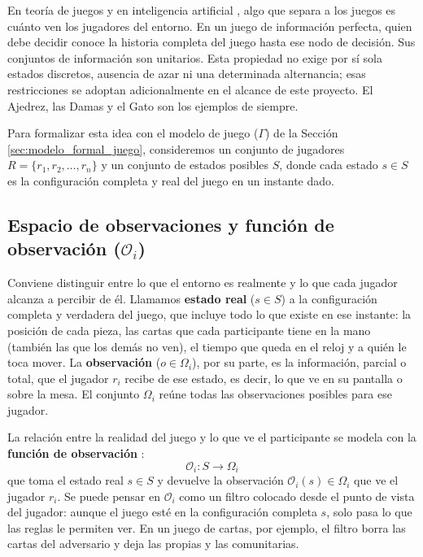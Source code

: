En teoría de juegos y en inteligencia artificial \cite{Kuhn1953, OsborneRubinstein1994, RussellNorvig2010}, algo que separa a los juegos es cuánto ven los jugadores del entorno. En un juego de información perfecta, quien debe decidir conoce la historia completa del juego hasta ese nodo de decisión. Sus conjuntos de información son unitarios. Esta propiedad no exige por sí sola estados discretos, ausencia de azar ni una determinada alternancia; esas restricciones se adoptan adicionalmente en el alcance de este proyecto. El Ajedrez, las Damas y el Gato son los ejemplos de siempre.

Para formalizar esta idea con el modelo de juego ($\Gamma$) de la Sección \ref{sec:modelo_formal_juego}, consideremos un conjunto de jugadores $R = \{r_1, r_2, \dots, r_n\}$ y un conjunto de estados posibles $S$, donde cada estado $s \in S$ es la configuración completa y real del juego en un instante dado.

\subsection{Espacio de observaciones y función de observación (\texorpdfstring{$\mathcal{O}_i$}{Oi})}

Conviene distinguir entre lo que el entorno es realmente y lo que cada jugador alcanza a percibir de él. Llamamos \textbf{estado real} ($s \in S$) a la configuración completa y verdadera del juego, que incluye todo lo que existe en ese instante: la posición de cada pieza, las cartas que cada participante tiene en la mano (también las que los demás no ven), el tiempo que queda en el reloj y a quién le toca mover. La \textbf{observación} ($o \in \Omega_i$), por su parte, es la información, parcial o total, que el jugador $r_i$ recibe de ese estado, es decir, lo que ve en su pantalla o sobre la mesa. El conjunto $\Omega_i$ reúne todas las observaciones posibles para ese jugador.

La relación entre la realidad del juego y lo que ve el participante se modela con la \textbf{función de observación} \cite{Thielscher2010GDLII, RussellNorvig2010}:
\begin{equation}
    \mathcal{O}_i : S \to \Omega_i
    \label{eq:funcion-observacion}
\end{equation}
que toma el estado real $s \in S$ y devuelve la observación $\mathcal{O}_i(s) \in \Omega_i$ que ve el jugador $r_i$. Se puede pensar en $\mathcal{O}_i$ como un filtro colocado desde el punto de vista del jugador: aunque el juego esté en la configuración completa $s$, solo pasa lo que las reglas le permiten ver. En un juego de cartas, por ejemplo, el filtro borra las cartas del adversario y deja las propias y las comunitarias.

